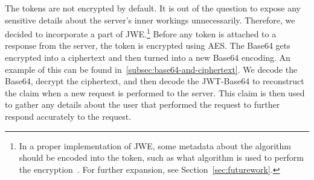 The tokens are not encrypted by default.
It is out of the question to expose any sensitive details about the server's
inner workings unnecessarily.
Therefore, we decided to incorporate a part of JWE.\footnote{
  In a proper implementation of JWE, some metadata about the algorithm should
  be encoded into the token, such as what algorithm is used to perform the
  encryption~\cite{rfc7516}. For further expansion, see
  Section~\ref{sec:futurework}.
}
Before any token is attached to a response from the server, the token is
encrypted using AES\@.
The Base64 gets encrypted into a ciphertext and then turned into a new Base64
encoding.
An example of this can be found in~\ref{subsec:base64-and-ciphertext}.
We decode the Base64, decrypt the ciphertext, and then decode the JWT-Base64 to
reconstruct the claim when a new request is performed to the server.
This claim is then used to gather any details about the user that performed
the request to further respond accurately to the request.

%




